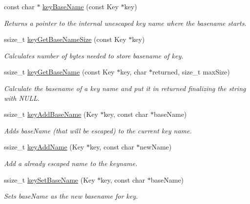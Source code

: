 \begin{DoxyCompactItemize}
const char $\ast$ \hyperlink{group__keyname_gaaff35e7ca8af5560c47e662ceb9465f5}{key\-Base\-Name} (const Key $\ast$key)
\begin{DoxyCompactList}\small\item\em Returns a pointer to the internal unescaped key name where the {\ttfamily basename} starts. \end{DoxyCompactList}\item 
ssize\-\_\-t \hyperlink{group__keyname_ga1a0b76c5d9e5367c7e72211e6c63d43a}{key\-Get\-Base\-Name\-Size} (const Key $\ast$key)
\begin{DoxyCompactList}\small\item\em Calculates number of bytes needed to store basename of {\ttfamily key}. \end{DoxyCompactList}\item 
ssize\-\_\-t \hyperlink{group__keyname_ga0992d26bcfca767cb8e77053a483eb64}{key\-Get\-Base\-Name} (const Key $\ast$key, char $\ast$returned, size\-\_\-t max\-Size)
\begin{DoxyCompactList}\small\item\em Calculate the basename of a key name and put it in {\ttfamily returned} finalizing the string with N\-U\-L\-L. \end{DoxyCompactList}\item 
ssize\-\_\-t \hyperlink{group__keyname_gaa942091fc4bd5c2699e49ddc50829524}{key\-Add\-Base\-Name} (Key $\ast$key, const char $\ast$base\-Name)
\begin{DoxyCompactList}\small\item\em Adds {\ttfamily base\-Name} (that will be escaped) to the current key name. \end{DoxyCompactList}\item 
ssize\-\_\-t \hyperlink{group__keyname_gaa70593a2c772c4b7bc33423b9b10a270}{key\-Add\-Name} (Key $\ast$key, const char $\ast$new\-Name)
\begin{DoxyCompactList}\small\item\em Add a already escaped name to the keyname. \end{DoxyCompactList}\item 
ssize\-\_\-t \hyperlink{group__keyname_ga6e804bd453f98c28b0ff51430d1df407}{key\-Set\-Base\-Name} (Key $\ast$key, const char $\ast$base\-Name)
\begin{DoxyCompactList}\small\item\em Sets {\ttfamily base\-Name} as the new basename for {\ttfamily key}. \end{DoxyCompactList}\end{DoxyCompactItemize}


